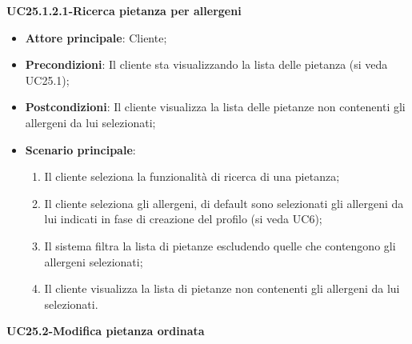 \textbf{UC25.1.2.1-Ricerca pietanza per allergeni}

\begin{itemize}
\item \textbf{Attore principale}: Cliente;
\item \textbf{Precondizioni}: Il cliente sta visualizzando la lista delle pietanza (si veda UC25.1);
\item \textbf{Postcondizioni}: Il cliente visualizza la lista delle pietanze non contenenti gli allergeni da lui selezionati;
\item \textbf{Scenario principale}:
\begin{enumerate}
\item Il cliente seleziona la funzionalità di ricerca di una pietanza;
\item Il cliente seleziona gli allergeni, di default sono selezionati gli allergeni da lui indicati in fase di creazione del profilo (si veda UC6);
\item Il sistema filtra la lista di pietanze escludendo quelle che contengono gli allergeni selezionati;
\item Il cliente visualizza la lista di pietanze non contenenti gli allergeni da lui selezionati.
\end{enumerate}
\end{itemize}

\textbf{UC25.2-Modifica pietanza ordinata}

